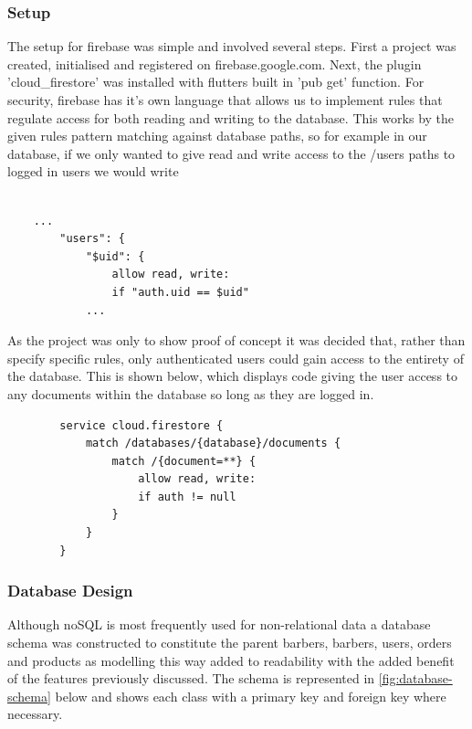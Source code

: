 \documentclass[12pt]{article}
\begin{document}
	\subsubsection{Setup}
	The setup for firebase was simple and involved several steps. First a project was created, initialised and registered on firebase.google.com. Next, the plugin 'cloud\_firestore' was installed with flutters built in 'pub get' function. For security, firebase has it's own language that allows us to implement rules that regulate access for both reading and writing to the database. This works by the given rules pattern matching against database paths, so for example in our database, if we only wanted to give read and write access to the /users paths to logged in users we would write 
	\begin{verbatim}

	...
		"users": {
			"$uid": {
				allow read, write:
				if "auth.uid == $uid"
			...
	\end{verbatim}

	As the project was only to show proof of concept it was decided that, rather than specify specific rules, only authenticated users could gain access to the entirety of the database. This is shown below, which displays code giving the user access to any documents within the database so long as they are logged in.
	
	\begin{verbatim}
		service cloud.firestore {
			match /databases/{database}/documents {
				match /{document=**} {
					allow read, write:
					if auth != null
				}
			}
		}
	\end{verbatim}
	
	
	\subsubsection{Database Design}
	Although noSQL is most frequently used for non-relational data a database schema was constructed to constitute the parent barbers, barbers, users, orders  and products as modelling this way added to readability with the added benefit of the features previously discussed. The schema is represented in \autoref{fig:database-schema} below and shows each class with a primary key and foreign key where necessary.
\end{document}
